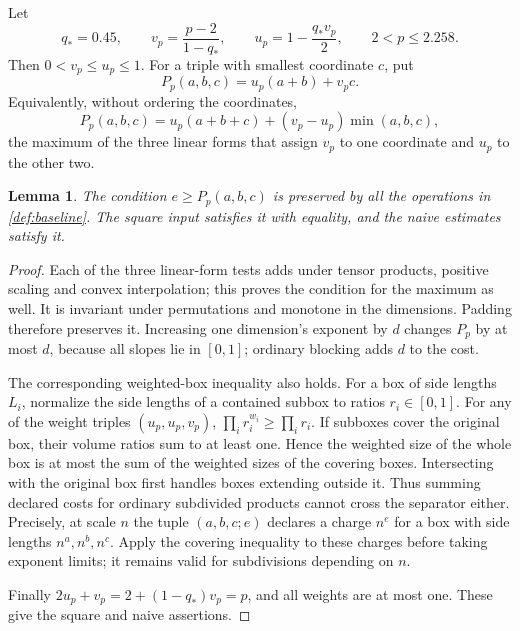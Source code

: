 \documentclass[11pt]{article}
\numberwithin{equation}{section}
\newtheorem{lemma}[theorem]{Lemma}
\theoremstyle{definition}
\theoremstyle{remark}
\begin{document}
Let
\begin{equation}\label{eq:plane-parameters}
 q_*=0.45,\qquad
 v_p=\frac{p-2}{1-q_*},\qquad
 u_p=1-\frac{q_*v_p}{2},\qquad 2<p\le2.258.
\end{equation}
Then \(0<v_p\le u_p\le1\).
For a triple with smallest coordinate \(c\), put
\begin{equation}\label{eq:plane}
 P_p(a,b,c)=u_p(a+b)+v_pc.
\end{equation}
Equivalently, without ordering the coordinates,
\[
 P_p(a,b,c)
 =u_p(a+b+c)+(v_p-u_p)\min(a,b,c),
\]
the maximum of the three linear forms that assign \(v_p\) to one
coordinate and \(u_p\) to the other two.

\begin{lemma}\label{lem:plane-preservation}
The condition \(e\ge P_p(a,b,c)\) is preserved by all the operations
in \cref{def:baseline}.  The square input satisfies it with equality,
and the naive estimates satisfy it.
\end{lemma}

\begin{proof}
Each of the three linear-form tests adds under tensor products,
positive scaling and convex interpolation; this proves the condition
for the maximum as well.
It is invariant under permutations and monotone in the dimensions.
Padding therefore preserves it.
Increasing one dimension's exponent by \(d\) changes \(P_p\) by at
most \(d\), because all slopes lie in \([0,1]\); ordinary blocking
adds \(d\) to the cost.

The corresponding weighted-box inequality also holds.
For a box of side lengths \(L_i\), normalize the side lengths of a
contained subbox to ratios \(r_i\in[0,1]\).
For any of the weight triples \((u_p,u_p,v_p)\),
\(\prod_i r_i^{w_i}\ge\prod_i r_i\).
If subboxes cover the original box, their volume ratios sum to at
least one.  Hence the weighted size of the whole box is at most
the sum of the weighted sizes of the covering boxes.
Intersecting with the original box first handles boxes extending
outside it.
Thus summing declared costs for ordinary subdivided products cannot
cross the separator either.
Precisely, at scale \(n\) the tuple \((a,b,c;e)\) declares a charge
\(n^e\) for a box with side lengths \(n^a,n^b,n^c\).
Apply the covering inequality to these charges before taking exponent
limits; it remains valid for subdivisions depending on \(n\).

Finally
\(2u_p+v_p=2+(1-q_*)v_p=p\), and all weights are at most one.
These give the square and naive assertions.
\end{proof}
\end{document}

